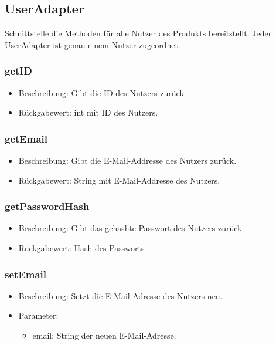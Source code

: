 \documentclass[a4paper]{scrreprt}
\begin{document}
    \subsection{UserAdapter}
    Schnittstelle die Methoden für alle Nutzer des Produkts bereitstellt.
    Jeder UserAdapter ist genau einem Nutzer zugeordnet.

    \subsubsection{getID}
    \begin{itemize}
        \item Beschreibung: Gibt die ID des Nutzers zurück.
        \item Rückgabewert: int mit ID des Nutzers.
    \end{itemize}

    \subsubsection{getEmail}
    \begin{itemize}
        \item Beschreibung: Gibt die E-Mail-Addresse des Nutzers zurück.
        \item Rückgabewert: String mit E-Mail-Addresse des Nutzers.
    \end{itemize}

    \subsubsection{getPasswordHash}
    \begin{itemize}
        \item Beschreibung: Gibt das gehashte Passwort des Nutzers zurück.
        \item Rückgabewert: Hash des Passworts
    \end{itemize}

    \subsubsection{setEmail}
    \begin{itemize}
        \item Beschreibung: Setzt die E-Mail-Adresse des Nutzers neu.
        \item Parameter:
        \begin{itemize}
            \item email: String der neuen E-Mail-Adresse.
        \end{itemize}
    \end{itemize}
\end{document}
